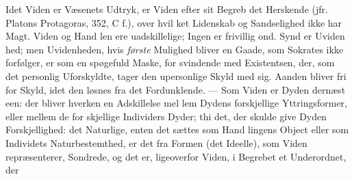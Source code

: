 \documentclass[12pt,a4paper]{book}
\begin{document}
Idet Viden er Væsenets Udtryk, er Viden efter sit Begreb
det Herskende (jfr. Platons Protagoras, 352, C f.), over hvil\-%
ket Lidenskab og Sandselighed ikke har Magt. Viden og Hand\-%
len ere uadskillelige; Ingen er frivillig ond. Synd er Uviden\-%
hed; men Uvidenheden, hvis \emph{første} Mulighed bliver en Gaade,
som Sokrates ikke forfølger, er som en spøgefuld Maske, for\-%
svindende med Existentsen, der, som det personlig Uforskyldte,
tager den upersonlige Skyld med sig. Aanden bliver fri for
Skyld, idet den løsnes fra det Fordunklende. --- Som Viden
er Dyden dernæst een: der bliver hverken en Adskillelse mel\-%
lem Dydens forskjellige Yttringsformer, eller mellem de for\-%
skjellige Individers Dyder; thi det, der skulde give Dyden
Forskjellighed: det Naturlige, enten det sættes som Hand\-%
lingens Object eller som Individets Naturbestemthed, er det
fra Formen (det Ideelle), som Viden repræsenterer, Sondrede,
og det er, ligeoverfor Viden, i Begrebet et Underordnet, der
\setcounter{footnote}{0}%
\end{document}

